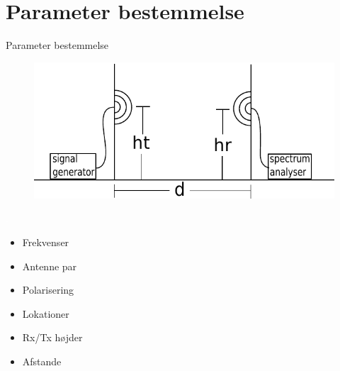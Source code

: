 \section{Parameter bestemmelse}
\begin{frame}{Parameter bestemmelse}
\begin{figure}[!htbp]
	\centering
	\includegraphics[width = 0.8\columnwidth]{figures/setup.pdf}
\end{figure}
\begin{minipage}{0.15\textwidth}
 \textcolor{white}{.}  
\end{minipage}%
\begin{minipage}{0.8\textwidth}
\begin{itemize}
\item Frekvenser
\item Antenne par
\item Polarisering
\item Lokationer
\item Rx/Tx højder
\item Afstande
\end{itemize}
\end{minipage}
\end{frame}

